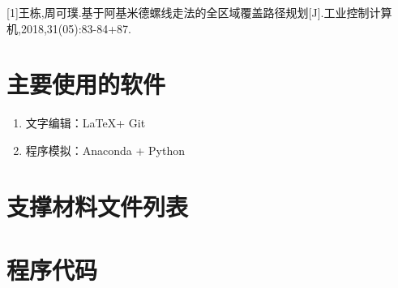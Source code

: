 

\nocite{*}

[1]王栋,周可璞.基于阿基米德螺线走法的全区域覆盖路径规划[J].工业控制计算机,2018,31(05):83-84+87.
\clearpage

\appendix


\section{主要使用的软件}

\begin{enumerate}
	\item 文字编辑：\LaTeX + Git
	\item 程序模拟：Anaconda + Python
\end{enumerate}


\section{支撑材料文件列表}



\section{程序代码}


%
%
%

